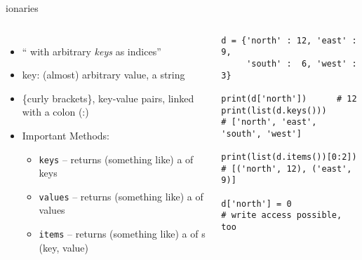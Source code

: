 \begin{frame}[fragile]{ionaries}
%
\vspace{-15pt}
\begin{columns}[t]
\begin{itemize}
\item \enquote{ with arbitrary \emph{keys} as indices}
\item key: (almost) arbitrary value, \eg a string
\item \{curly brackets\}, key-value pairs, linked with a colon (:)
\item Important Methods:
	\begin{itemize}
	\item \texttt{keys} -- returns (something like) a  of keys
	\item \texttt{values} -- returns (something like) a  of values
	\item \texttt{items} -- returns (something like) a  of s (key, value)
	\end{itemize}
\end{itemize}
%
\begin{codebox}
\begin{verbatim}
d = {'north' : 12, 'east' : 9,
     'south' :  6, 'west' : 3}

print(d['north'])      # 12
print(list(d.keys()))
# ['north', 'east', 'south', 'west']

print(list(d.items())[0:2])
# [('north', 12), ('east', 9)]

d['north'] = 0
# write access possible, too
\end{verbatim}
\end{codebox}
\end{columns}
%
\end{frame}


